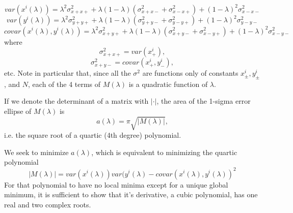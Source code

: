 \documentclass{article}
\begin{document}
$$var(x^i(\lambda)) = \lambda^2\sigma^2_{x+x+} + \lambda(1-\lambda)(\sigma^2_{x+x-} + \sigma^2_{x-x+}) 
                + (1-\lambda)^2\sigma^2_{x-x-}$$
$$var(y^i(\lambda)) = \lambda^2\sigma^2_{y+y+} + \lambda(1-\lambda)(\sigma^2_{y+y-} + \sigma^2_{y-y+}) 
                + (1-\lambda)^2\sigma^2_{y-y-}$$
$$covar(x^i(\lambda),y^i(\lambda)) = \lambda^2\sigma^2_{x+y+}  
                        + \lambda(1-\lambda)(\sigma^2_{x+y-} + \sigma^2_{x-y+}) 
                              + (1-\lambda)^2\sigma^2_{x-y-}$$
where
$$\sigma^2_{x+x+}=var(x^i_+),$$
$$\sigma^2_{x+y-}=covar(x^i_+, y^i_-),$$
etc. Note in particular that, since all the $\sigma^2$ are functions only of constants $x^i_\pm, y^i_\pm$, and $N$, each of the 4 terms of $M(\lambda)$ is a quadratic function of $\lambda$.

If we denote the determinant of a matrix with $|\cdot|$, the area of the
1-sigma error ellipse of $M(\lambda)$ is
$$a(\lambda) = \pi\sqrt{|M(\lambda)|},$$
i.e. the square root of a quartic (4th degree) polynomial.

We seek to minimize $a(\lambda)$, which is equivalent to minimizing
the quartic polynomial 
$$|M(\lambda)| = var(x^i(\lambda))var(y^i(\lambda) - covar(x^i(\lambda),y^i(\lambda))^2$$
For that polynomial to have no local minima
except for a unique global minimum, it is sufficient to show that it's
derivative, a cubic polynomial, has one real and two complex roots.


 
\end{document}
